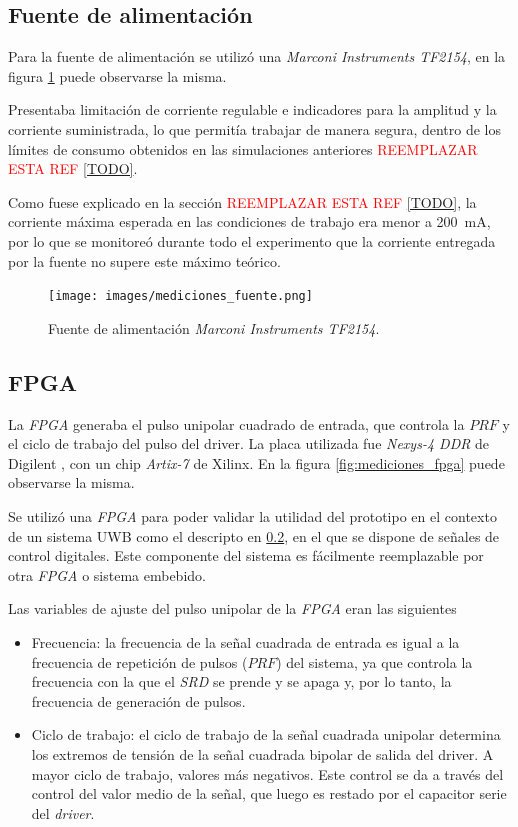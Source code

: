 \subsection{Fuente de alimentación}

Para la fuente de alimentación se utilizó una \textit{Marconi Instruments
TF2154}, en la figura \ref{fig:mediciones_fuente} puede observarse la misma.

Presentaba limitación de corriente regulable e indicadores para la amplitud y la
corriente suministrada, lo que permitía trabajar de manera segura, dentro de los
límites de consumo obtenidos en las simulaciones anteriores
\textcolor{red}{REEMPLAZAR ESTA REF \ref{TODO}}.

Como fuese explicado en la sección \textcolor{red}{REEMPLAZAR ESTA REF
\ref{TODO}},
la corriente máxima esperada en las condiciones de trabajo era menor a \qty{200}{\milli\ampere},
por lo que se monitoreó durante todo el experimento que la corriente entregada por la fuente
no supere este máximo teórico.

\begin{figure}
  \centering
    \texttt{[image: images/mediciones\_fuente.png]}
    \caption{Fuente de alimentación \textit{Marconi Instruments TF2154}.}
    \label{fig:mediciones_fuente}
\end{figure}


\subsection{FPGA}

La \textit{FPGA} generaba el pulso unipolar cuadrado de entrada, que controla la
$PRF$ y el ciclo de trabajo del pulso del driver. La placa utilizada fue
\textit{Nexys-4 DDR} de Digilent \cite{digilent_nexys4ddr}, con un chip
\textit{Artix-7} de Xilinx. En la figura \ref{fig:mediciones_fpga} puede
observarse la misma. 

Se utilizó una \textit{FPGA} para poder validar la utilidad del prototipo en el
contexto de un sistema UWB como el descripto en \ref{}, en el que se dispone de
señales de control digitales. Este componente del sistema es fácilmente
reemplazable por otra \textit{FPGA} o sistema embebido.

Las variables de ajuste del pulso unipolar de la \textit{FPGA} eran las siguientes

\begin{itemize}
  \item Frecuencia: la frecuencia de la señal cuadrada de entrada es igual a la
    frecuencia de repetición de pulsos ($PRF$) del sistema, ya que controla la
    frecuencia con la que el \textit{SRD} se prende y se apaga y, por lo tanto,
    la frecuencia de generación de pulsos.
  \item Ciclo de trabajo: el ciclo de trabajo de la señal cuadrada unipolar
    determina los extremos de tensión de la señal cuadrada bipolar de salida del
    driver. A mayor ciclo de trabajo, valores más negativos. Este control se da
    a través del control del valor medio de la señal, que luego es restado por
    el capacitor serie del \textit{driver}.
\end{itemize}

